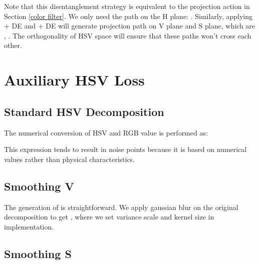 \documentclass[runningheads]{llncs}
\begin{document}
   Note that this disentanglement strategy is equivalent to the projection action in Section \ref{color filter}.
   We only need the path  on the H plane: .
   Similarly, applying  + DE and  + DE will generate projection path on V plane and S plane, which are , . The orthogonality of HSV space will ensure that these paths won't cross each other.
   







\section{Auxiliary HSV Loss}
\label{sec:auxiliary-hsv-loss}

\subsection{Standard HSV Decomposition}
\label{standard hsl}
The numerical conversion of HSV and RGB value is performed as:




This expression tends to result in noise points because it is based on numerical values rather than physical characteristics.


\subsection{Smoothing V}

The generation of  is straightforward.
We apply gaussian blur on the original  decomposition to get , where we set variance scale  and kernel size  in implementation.



\subsection{Smoothing S}
\end{document}

